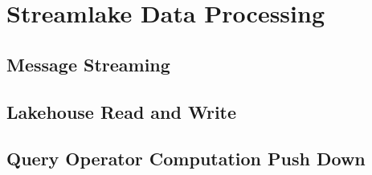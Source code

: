 \section{Streamlake Data Processing} 
\label{sec:dataeva}


\subsection{Message Streaming}


\subsection{Lakehouse Read and Write}


\subsection{Query Operator Computation Push Down}